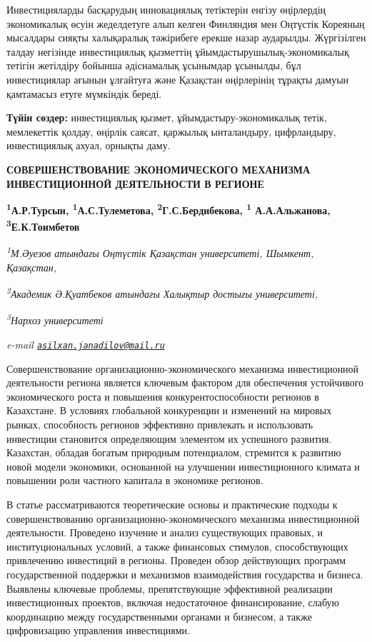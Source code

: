 Инвестицияларды басқарудың инновациялық тетіктерін енгізу өңірлердің
экономикалық өсуін жеделдетуге алып келген Финляндия мен Оңтүстік
Кореяның мысалдары сияқты халықаралық тәжірибеге ерекше назар аударылды.
Жүргізілген талдау негізінде инвестициялық қызметтің
ұйымдастырушылық-экономикалық тетігін жетілдіру бойынша әдіснамалық
ұсынымдар ұсынылды, бұл инвестициялар ағынын ұлғайтуға және Қазақстан
өңірлерінің тұрақты дамуын қамтамасыз етуге мүмкіндік береді.

{\bfseries Түйін сөздер:} инвестициялық қызмет, ұйымдастыру-экономикалық
тетік, мемлекеттік қолдау, өңірлік саясат, қаржылық ынталандыру,
цифрландыру, инвестициялық ахуал, орнықты даму.

\begin{articleheader}
{\bfseries СОВЕРШЕНСТВОВАНИЕ ЭКОНОМИЧЕСКОГО МЕХАНИЗМА ИНВЕСТИЦИОННОЙ
ДЕЯТЕЛЬНОСТИ В РЕГИОНЕ}

{\bfseries \textsuperscript{1}А.Р.Турсын\textsuperscript{\envelope },
\textsuperscript{1}А.С.Тулеметова,
\textsuperscript{2}Г.С.Бердибекова,
\textsuperscript{1} А.А.Альжанова,
\textsuperscript{3}Е.К.Тоимбетов}
\end{articleheader}

\begin{affiliation}
\emph{\textsuperscript{1}М.Әуезов атындағы Оңтүстік Қазақстан
университеті, Шымкент, Қазақстан,}

\emph{\textsuperscript{2}Академик Ә.Қуатбеков атындағы Халықтыр достығы
университеті,}

\emph{\textsuperscript{3}Нархоз университеті}

\emph{e-mail \href{mailto:asilxan.janadilov@mail.ru}{\nolinkurl{asilxan.janadilov@mail.ru}}}
\end{affiliation}

Совершенствование организационно-экономического механизма инвестиционной
деятельности региона является ключевым фактором для обеспечения
устойчивого экономического роста и повышения конкурентоспособности
регионов в Казахстане. В условиях глобальной конкуренции и изменений на
мировых рынках, способность регионов эффективно привлекать и
использовать инвестиции становится определяющим элементом их успешного
развития. Казахстан, обладая богатым природным потенциалом, стремится к
развитию новой модели экономики, основанной на улучшении инвестиционного
климата и повышении роли частного капитала в экономике регионов.

В статье рассматриваются теоретические основы и практические подходы к
совершенствованию организационно-экономического механизма инвестиционной
деятельности. Проведено изучение и анализ существующих правовых, и
институциональных условий, а также финансовых стимулов, способствующих
привлечению инвестиций в регионы. Проведен обзор действующих программ
государственной поддержки и механизмов взаимодействия государства и
бизнеса. Выявлены ключевые проблемы, препятствующие эффективной
реализации инвестиционных проектов, включая недостаточное
финансирование, слабую координацию между государственными органами и
бизнесом, а также цифровизацию управления инвестициями.

